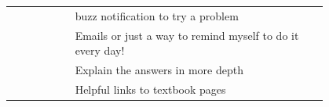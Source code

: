 \begin{longtable}{r|p{0.8\linewidth}}
		& buzz notification to try a problem                                                                                                                                                                                                                                                                                                                                                                                                                                                                                                                                                                                                                                                                                                               \\
		& Emails or just a way to remind myself to do it every day!                                                                                                                                                                                                                                                                                                                                                                                                                                                                                                                                                                                                                                                                                        \\
		& Explain the answers in more depth                                                                                                                                                                                                                                                                                                                                                                                                                                                                                                                                                                                                                                                                                                                \\
		& Helpful links to textbook pages                                                                                                                                                                                                                                                                                                                                                                                                                                                                                                                                                                                                                                                                                                                  \\

\end{longtable}
